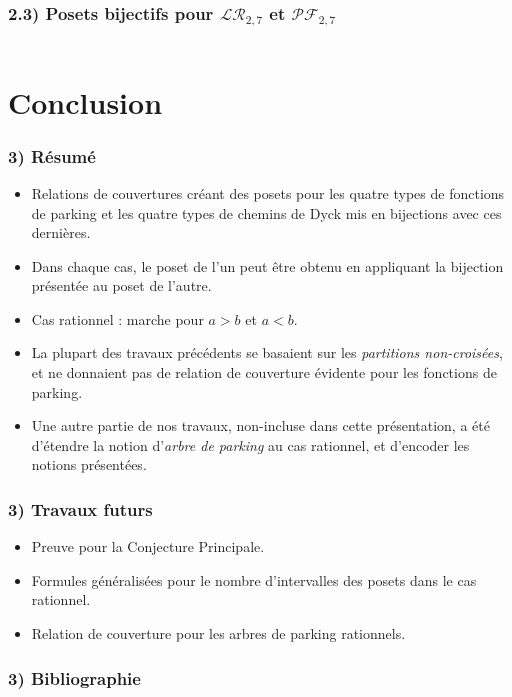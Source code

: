 \documentclass{beamer}
\begin{document}
\begin{frame} %
    \frametitle{2.3) Posets \textbf{bijectifs} pour $\mathcal{LR}_{2,7}$ et
        $\mathcal{PF}_{2,7}$}
        \begin{columns}
            \begin{column}{0.5\textwidth}
                
            \end{column}
            \begin{column}{0.5\textwidth}
                
            \end{column}
        \end{columns}
\end{frame}

\section{Conclusion} %

\begin{frame} %
    \frametitle{3) Résumé}
    \begin{itemize}
        \item Relations de couvertures créant des
        posets pour les quatre types de fonctions de parking et
        les quatre types de chemins de Dyck mis en bijections
        avec ces dernières.
        \item Dans chaque cas, le poset de l'un peut être obtenu en appliquant la
        bijection présentée au poset de l'autre.
        \item Cas rationnel : marche pour $a > b$ et $a < b$.
        \item La plupart des travaux précédents se basaient sur les
            \emph{partitions non-croisées}, et ne donnaient pas de relation de
            couverture évidente pour les fonctions de parking.
                
        \item Une autre partie de nos travaux, non-incluse dans cette
            présentation, a été d'étendre la notion d'\emph{arbre de parking}
            au cas rationnel, et d'encoder les notions présentées.
    \end{itemize}
\end{frame}

\begin{frame} %
    \frametitle{3) Travaux futurs}
    \begin{itemize}
        \item Preuve pour la Conjecture Principale.
        \item Formules généralisées pour le nombre d'intervalles des posets
            dans le cas rationnel.
        \item Relation de couverture pour les arbres de parking rationnels.
    \end{itemize}
\end{frame}

\begin{frame} %
    \frametitle{3) Bibliographie}
    \small
    
    
    \nocite{*}
\end{frame}
\end{document}
